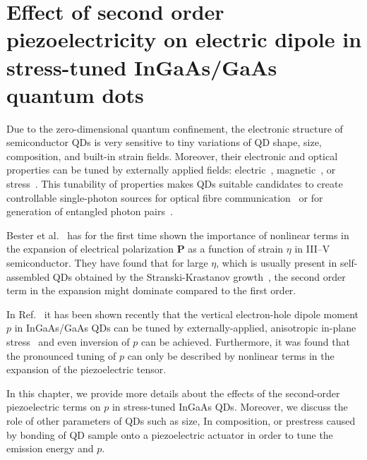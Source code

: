 
\chapter{Effect of second order piezoelectricity on electric dipole in stress-tuned InGaAs/GaAs quantum dots}\label{chap:2order_piezo}

Due to the zero-dimensional quantum confinement, the electronic structure of semiconductor QDs is very sensitive to tiny variations of QD shape, size, composition, and built-in strain fields.
%
%
Moreover, their electronic and optical properties can be tuned by externally applied fields: electric~\cite{Gerardot_2007, Vogel_2007}, magnetic~\cite{Stevenson_2006}, or stress~\citep{kleDresden}. This tunability of properties makes QDs suitable candidates to create controllable single-photon sources for optical fibre communication~\cite{Huffaker1998} or for generation of entangled photon pairs~\cite{Trotta:16}.

Bester et al.~\citep{Bester:06, Bester:06_2} has for the first time shown the importance of nonlinear terms in the expansion of electrical polarization $\mathbf{P}$ as a function of strain $\eta$ in III--V semiconductor. They have found that for large $\eta$, which is usually present in self-assembled QDs obtained by the Stranski-Krastanov growth~\cite{Grundmann}, the second order term in the expansion might dominate compared to the first order.

In Ref.~\cite{Aberl:17} it has been shown recently that the vertical electron-hole dipole moment $p$ in InGaAs/GaAs QDs can be tuned by externally-applied, anisotropic in-plane stress~\cite{Trotta:12,Trotta:13} and even inversion of $p$ can be achieved. Furthermore, it was found that the pronounced tuning of $p$ can only be described by nonlinear terms in the expansion of the piezoelectric tensor. 

In this chapter, we provide more details about the effects of the second-order piezoelectric terms on $p$ in stress-tuned InGaAs QDs. Moreover, we discuss the role of other parameters of QDs such as size, In composition, or prestress caused by bonding of QD sample onto a piezoelectric actuator in order to tune the emission energy and $p$. 

